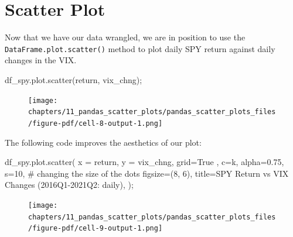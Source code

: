 \documentclass[
  letterpaper,
  DIV=11,
  numbers=noendperiod]{scrreprt}
\newenvironment{Shaded}{\begin{snugshade}}{\end{snugshade}}
\newcommand{\CommentTok}[1]{\textcolor[rgb]{0.37,0.37,0.37}{#1}}
\newcommand{\DecValTok}[1]{\textcolor[rgb]{0.68,0.00,0.00}{#1}}
\newcommand{\FloatTok}[1]{\textcolor[rgb]{0.68,0.00,0.00}{#1}}
\newcommand{\NormalTok}[1]{\textcolor[rgb]{0.00,0.23,0.31}{#1}}
\newcommand{\OperatorTok}[1]{\textcolor[rgb]{0.37,0.37,0.37}{#1}}
\newcommand{\StringTok}[1]{\textcolor[rgb]{0.13,0.47,0.30}{#1}}
\newcommand{\VariableTok}[1]{\textcolor[rgb]{0.07,0.07,0.07}{#1}}
\begin{document}
\hypertarget{scatter-plot}{%
\section{Scatter Plot}\label{scatter-plot}}

Now that we have our data wrangled, we are in position to use the
\texttt{DataFrame.plot.scatter()} method to plot daily SPY return
against daily changes in the VIX.

\begin{Shaded}
\begin{Highlighting}[]
\NormalTok{df\_spy.plot.scatter(}\StringTok{\textquotesingle{}return\textquotesingle{}}\NormalTok{, }\StringTok{\textquotesingle{}vix\_chng\textquotesingle{}}\NormalTok{)}\OperatorTok{;}
\end{Highlighting}
\end{Shaded}

\begin{figure}[H]

{\centering \texttt{[image: chapters/11\_pandas\_scatter\_plots/pandas\_scatter\_plots\_files/figure-pdf/cell-8-output-1.png]}

}

\end{figure}

The following code improves the aesthetics of our plot:

\begin{Shaded}
\begin{Highlighting}[]
\NormalTok{df\_spy.plot.scatter(}
\NormalTok{    x }\OperatorTok{=} \StringTok{\textquotesingle{}return\textquotesingle{}}\NormalTok{,}
\NormalTok{    y }\OperatorTok{=} \StringTok{\textquotesingle{}vix\_chng\textquotesingle{}}\NormalTok{,}
\NormalTok{    grid}\OperatorTok{=}\VariableTok{True}\NormalTok{ ,  }
\NormalTok{    c}\OperatorTok{=}\StringTok{\textquotesingle{}k\textquotesingle{}}\NormalTok{,}
\NormalTok{    alpha}\OperatorTok{=}\FloatTok{0.75}\NormalTok{,}
\NormalTok{    s}\OperatorTok{=}\DecValTok{10}\NormalTok{,  }\CommentTok{\# changing the size of the dots}
\NormalTok{    figsize}\OperatorTok{=}\NormalTok{(}\DecValTok{8}\NormalTok{, }\DecValTok{6}\NormalTok{),}
\NormalTok{    title}\OperatorTok{=}\StringTok{\textquotesingle{}SPY Return vs VIX Changes (2016Q1{-}2021Q2: daily)\textquotesingle{}}\NormalTok{,}
\NormalTok{)}\OperatorTok{;}
\end{Highlighting}
\end{Shaded}

\begin{figure}[H]

{\centering \texttt{[image: chapters/11\_pandas\_scatter\_plots/pandas\_scatter\_plots\_files/figure-pdf/cell-9-output-1.png]}

}

\end{figure}
\end{document}
